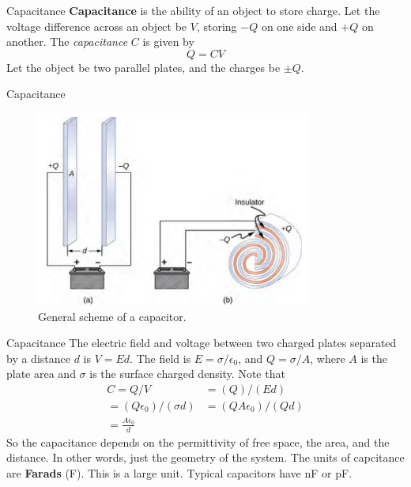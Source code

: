 \documentclass{beamer}
\begin{document}
\begin{frame}{Capacitance}
\textbf{Capacitance} is the ability of an object to store charge.  Let the voltage difference across an object be $V$, storing $-Q$ on one side and $+Q$ on another.  The \textit{capacitance} $C$ is given by
\begin{equation}
Q = C V
\end{equation}
Let the object be two parallel plates, and the charges be $\pm Q$.
\end{frame}

\begin{frame}{Capacitance}
\begin{figure}
\centering
\includegraphics[width=0.8\textwidth]{figures/cap.png}
\caption{\label{fig:cap} General scheme of a capacitor.}
\end{figure}
\end{frame}

\begin{frame}{Capacitance}
The electric field and voltage between two charged plates separated by a distance $d$ is $V = Ed$.  The field is $E = \sigma/\epsilon_0$, and $Q = \sigma/A$, where $A$ is the plate area and $\sigma$ is the surface charged density.  Note that
\begin{align}
C = Q/V &= (Q)/(E d) \\
= (Q \epsilon_0)/(\sigma d) &= (Q A \epsilon_0)/(Q d) \\
= \frac{A \epsilon_0}{d} &
\end{align}
So the capacitance depends on the permittivity of free space, the area, and the distance.  In other words, just the geometry of the system.  The units of capcitance are \textbf{\alert{Farads}} (F).  This is a large unit.  Typical capacitors have nF or pF.
\end{frame}
\end{document}
